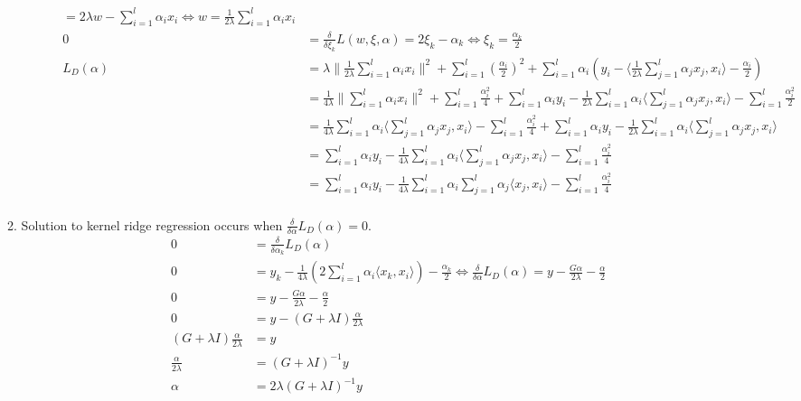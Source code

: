 \documentclass{article}
\newcommand*{\0}{\Vec{0}}
\newcommand*{\al}{\alpha}
\newcommand*{\de}{\delta}
\newcommand*{\la}{\lambda}
\begin{document}
\begin{enumerate}
\begin{enumerate}
\begin{description}
\begin{align*}
							= 2\la w - \sum_{i=1}^l\al_i x_i \iff
							w = \frac{1}{2\la}\sum_{i=1}^l\al_i x_i \\
							0 &= \frac{\de}{\de \xi_k}L(w,\xi,\al)
							= 2\xi_k-\al_k \iff \xi_k = \frac{\al_k}{2} \\
							L_D(\al)
							&= \la\| \frac{1}{2\la}\sum_{i=1}^l\al_i x_i \|^2 +\sum_{i=1}^l\left( \frac{\al_i}{2} \right)^2+\sum_{i=1}^l\al_i(y_i - \langle \frac{1}{2\la}\sum_{j=1}^l\al_j x_j, x_i \rangle - \frac{\al_i}{2}) \\
							&= \frac{1}{4\la}\| \sum_{i=1}^l\al_i x_i \|^2 +\sum_{i=1}^l \frac{\al_i^2}{4} +\sum_{i=1}^l\al_iy_i - \frac{1}{2\la}\sum_{i=1}^l\al_i\langle \sum_{j=1}^l\al_j x_j, x_i \rangle - \sum_{i=1}^l \frac{\al_i^2}{2} \\
							&= \frac{1}{4\la}\sum_{i=1}^l\al_i\langle \sum_{j=1}^l\al_j x_j, x_i \rangle -\sum_{i=1}^l \frac{\al_i^2}{4} +\sum_{i=1}^l\al_iy_i - \frac{1}{2\la}\sum_{i=1}^l\al_i\langle \sum_{j=1}^l\al_j x_j, x_i \rangle \\
							&= \sum_{i=1}^l\al_iy_i - \frac{1}{4\la}\sum_{i=1}^l\al_i\langle \sum_{j=1}^l\al_j x_j, x_i \rangle -\sum_{i=1}^l \frac{\al_i^2}{4} \\
							&= \sum_{i=1}^l\al_iy_i - \frac{1}{4\la}\sum_{i=1}^l\al_i \sum_{j=1}^l\al_j \langle x_j, x_i \rangle -\sum_{i=1}^l \frac{\al_i^2}{4} \\
						\end{align*}
				\end{description}
			\item Solution to kernel ridge regression occurs when $\frac{\de}{\de \al}L_D(\al)=0$.
				\begin{align*}
					0 &= \frac{\de}{\de \al_k}L_D(\al) \\
					0 &= y_k -\frac{1}{4\la}\left( 2\sum_{i=1}^l \al_i\langle x_k, x_i \rangle \right) - \frac{\al_k}{2} \iff
					\frac{\de}{\de \al}L_D(\al)
					= y -\frac{G\al}{2\la} - \frac{\al}{2} \\
					0 &= y -\frac{G\al}{2\la} - \frac{\al}{2} \\
					0 &= y - \left(G + \la I\right)\frac{\al}{2\la} \\
					\left(G + \la I\right)\frac{\al}{2\la} &= y \\
					\frac{\al}{2\la} &= \left(G + \la I\right)^{-1}y \\
					\al &= 2\la\left(G + \la I\right)^{-1}y \\
				\end{align*}
		\end{enumerate}
\end{enumerate}

%
%
\end{document}
